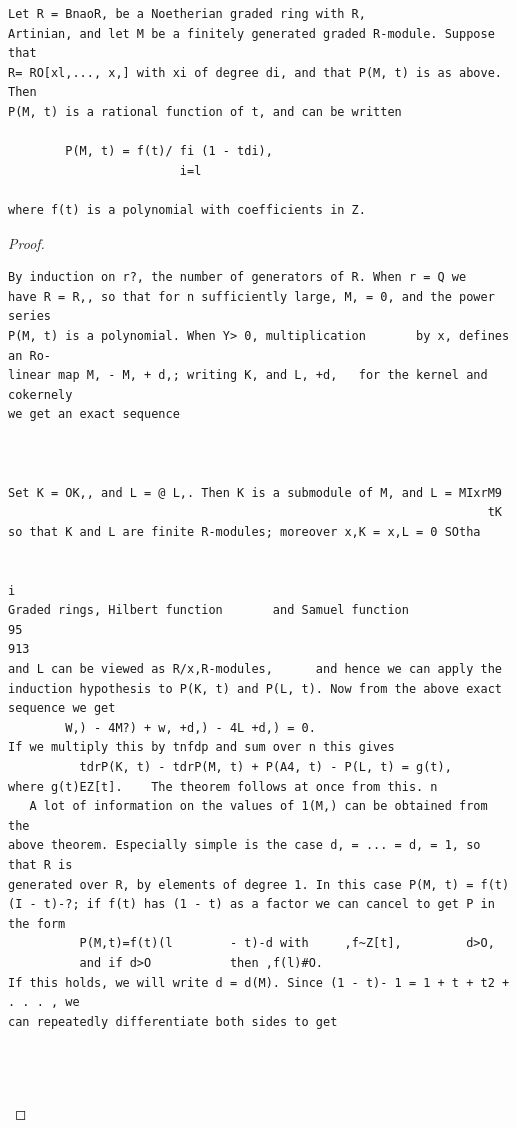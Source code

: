 \begin{theorem}\label{mcrt-auto-theorem-13-2}\uses{}
\begin{verbatim}
Let R = BnaoR, be a Noetherian graded ring with R,
Artinian, and let M be a finitely generated graded R-module. Suppose that
R= RO[xl,..., x,] with xi of degree di, and that P(M, t) is as above. Then
P(M, t) is a rational function of t, and can be written

        P(M, t) = f(t)/ fi (1 - tdi),
                        i=l

where f(t) is a polynomial with coefficients in Z.
\end{verbatim}
\end{theorem}
\begin{proof}
\begin{verbatim}
By induction on r?, the number of generators of R. When r = Q we
have R = R,, so that for n sufficiently large, M, = 0, and the power series
P(M, t) is a polynomial. When Y> 0, multiplication       by x, defines an Ro-
linear map M, - M, + d,; writing K, and L, +d,   for the kernel and cokernely
we get an exact sequence



Set K = OK,, and L = @ L,. Then K is a submodule of M, and L = MIxrM9
                                                                   tK
so that K and L are finite R-modules; moreover x,K = x,L = 0 SOtha

                                                                                 i
Graded rings, Hilbert function       and Samuel function                     95
913
and L can be viewed as R/x,R-modules,      and hence we can apply the
induction hypothesis to P(K, t) and P(L, t). Now from the above exact
sequence we get
        W,) - 4M?) + w, +d,) - 4L +d,) = 0.
If we multiply this by tnfdp and sum over n this gives
          tdrP(K, t) - tdrP(M, t) + P(A4, t) - P(L, t) = g(t),
where g(t)EZ[t].    The theorem follows at once from this. n
   A lot of information on the values of 1(M,) can be obtained from the
above theorem. Especially simple is the case d, = ... = d, = 1, so that R is
generated over R, by elements of degree 1. In this case P(M, t) = f(t)
(I - t)-?; if f(t) has (1 - t) as a factor we can cancel to get P in the form
          P(M,t)=f(t)(l        - t)-d with     ,f~Z[t],         d>O,
          and if d>O           then ,f(l)#O.
If this holds, we will write d = d(M). Since (1 - t)- 1 = 1 + t + t2 + . . . , we
can repeatedly differentiate both sides to get




\end{verbatim}
\end{proof}
